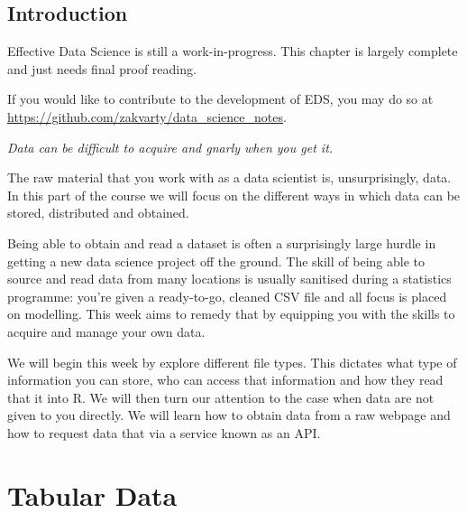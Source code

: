 \documentclass[
  letterpaper,
  DIV=11,
  numbers=noendperiod]{scrreprt}
\begin{document}
\section*{Introduction}\label{data-introduction}


\begin{tcolorbox}[enhanced jigsaw, coltitle=black, opacityback=0, left=2mm, titlerule=0mm, breakable, colback=white, opacitybacktitle=0.6, colbacktitle=quarto-callout-note-color!10!white, bottomtitle=1mm, toptitle=1mm, colframe=quarto-callout-note-color-frame, bottomrule=.15mm, leftrule=.75mm, title=\textcolor{quarto-callout-note-color}{\faInfo}\hspace{0.5em}{Note}, toprule=.15mm, arc=.35mm, rightrule=.15mm]

Effective Data Science is still a work-in-progress. This chapter is
largely complete and just needs final proof reading.

If you would like to contribute to the development of EDS, you may do so
at \url{https://github.com/zakvarty/data_science_notes}.

\end{tcolorbox}

\emph{Data can be difficult to acquire and gnarly when you get it.}

The raw material that you work with as a data scientist is,
unsurprisingly, data. In this part of the course we will focus on the
different ways in which data can be stored, distributed and obtained.

Being able to obtain and read a dataset is often a surprisingly large
hurdle in getting a new data science project off the ground. The skill
of being able to source and read data from many locations is usually
sanitised during a statistics programme: you're given a ready-to-go,
cleaned CSV file and all focus is placed on modelling. This week aims to
remedy that by equipping you with the skills to acquire and manage your
own data.

We will begin this week by explore different file types. This dictates
what type of information you can store, who can access that information
and how they read that it into R. We will then turn our attention to the
case when data are not given to you directly. We will learn how to
obtain data from a raw webpage and how to request data that via a
service known as an API.

\chapter{Tabular Data}\label{data-tabular}
\end{document}
